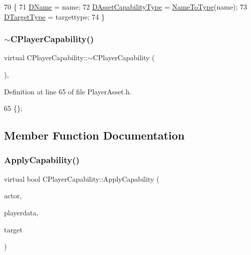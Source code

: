 \begin{DoxyCode}
70                                                                                  \{
71     \hyperlink{classCPlayerCapability_aae795f4ae4c19a9c7792a4101ca18560}{DName} = name;
72     \hyperlink{classCPlayerCapability_a09011bc8c74c698bfb65f06a1840c6e1}{DAssetCapabilityType} = \hyperlink{classCPlayerCapability_a920a696526e8a839f728192aea0ba1c5}{NameToType}(name);
73     \hyperlink{classCPlayerCapability_af3e2c3d386fbdce314d36e3e16ee823c}{DTargetType} = targettype;
74 \}
\end{DoxyCode}
\hypertarget{classCPlayerCapability_afd26c4ec0dd3f55ef316e90aa0648be1}{}\label{classCPlayerCapability_afd26c4ec0dd3f55ef316e90aa0648be1} 
\subsubsection{\texorpdfstring{$\sim$\+C\+Player\+Capability()}{~CPlayerCapability()}}
{\footnotesize\ttfamily virtual C\+Player\+Capability\+::$\sim$\+C\+Player\+Capability (\begin{DoxyParamCaption}{ }\end{DoxyParamCaption})\hspace{0.3cm}{\ttfamily [inline]}, {\ttfamily [virtual]}}



Definition at line 65 of file Player\+Asset.\+h.


\begin{DoxyCode}
65 \{\};
\end{DoxyCode}


\subsection{Member Function Documentation}
\hypertarget{classCPlayerCapability_a2ca6fd7fbd9c0178f1cf1d049c63825f}{}\label{classCPlayerCapability_a2ca6fd7fbd9c0178f1cf1d049c63825f} 
\subsubsection{\texorpdfstring{Apply\+Capability()}{ApplyCapability()}}
{\footnotesize\ttfamily virtual bool C\+Player\+Capability\+::\+Apply\+Capability (\begin{DoxyParamCaption}\item[{std\+::shared\+\_\+ptr$<$ \hyperlink{classCPlayerAsset}{C\+Player\+Asset} $>$}]{actor,  }\item[{std\+::shared\+\_\+ptr$<$ \hyperlink{classCPlayerData}{C\+Player\+Data} $>$}]{playerdata,  }\item[{std\+::shared\+\_\+ptr$<$ \hyperlink{classCPlayerAsset}{C\+Player\+Asset} $>$}]{target }\end{DoxyParamCaption})\hspace{0.3cm}{\ttfamily [pure virtual]}}



